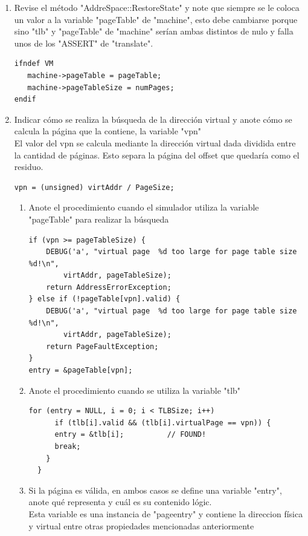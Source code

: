 \documentclass[11pt]{article}
\begin{document}
\begin{enumerate}
\begin{enumerate}
      \item Revise el método "AddreSpace::RestoreState" y note que siempre se le coloca un valor a la variable "pageTable" de "machine", esto debe cambiarse porque sino "tlb" y "pageTable" de "machine" serían ambas distintos de nulo y falla unos de los "ASSERT" de "translate".\\
      \begin{lstlisting}
ifndef VM
   machine->pageTable = pageTable;
   machine->pageTableSize = numPages;
endif
      \end{lstlisting}
            
            
      \item Indicar cómo se realiza la búsqueda de la dirección virtual y anote cómo se calcula la página que la contiene, la variable "vpn"\\
      El valor del vpn se calcula mediante la dirección virtual dada dividida entre la cantidad de páginas. Esto separa la página del offset que quedaría como el residuo.
            \begin{lstlisting}
vpn = (unsigned) virtAddr / PageSize;
            \end{lstlisting}
            \begin{enumerate}
        \item Anote el procedimiento cuando el simulador utiliza la variable "pageTable" para realizar la búsqueda
              \begin{lstlisting}
if (vpn >= pageTableSize) {
    DEBUG('a', "virtual page  %d too large for page table size %d!\n", 
		virtAddr, pageTableSize);
    return AddressErrorException;
} else if (!pageTable[vpn].valid) {
    DEBUG('a', "virtual page  %d too large for page table size %d!\n", 
		virtAddr, pageTableSize);
    return PageFaultException;
}
entry = &pageTable[vpn];
              \end{lstlisting}
              \item Anote el procedimiento cuando se utiliza la variable "tlb"
              \begin{lstlisting}
for (entry = NULL, i = 0; i < TLBSize; i++)
	  if (tlb[i].valid && (tlb[i].virtualPage == vpn)) {
      entry = &tlb[i];			// FOUND!
      break;
    }
  }
              \end{lstlisting}
              \item Si la página es válida, en ambos casos se define una variable "entry", anote qué representa y cuál es su contenido lógic.\\
              Esta variable es una instancia de "pageentry" y contiene la direccion física y virtual entre otras propiedades mencionadas anteriormente

\end{enumerate}
\end{enumerate}
\end{enumerate}
\end{document}
